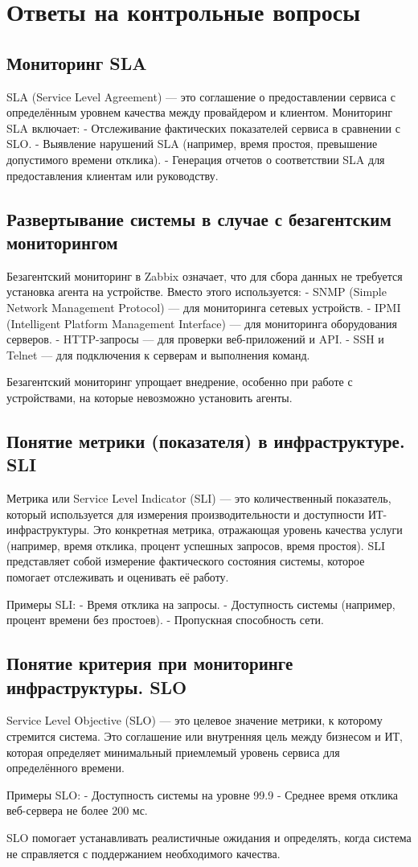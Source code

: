 \clearpage

\section{Ответы на контрольные вопросы}
\subsection{Мониторинг SLA}
SLA (Service Level Agreement) — это соглашение о предоставлении сервиса с определённым уровнем качества между провайдером и клиентом. Мониторинг SLA включает:
- Отслеживание фактических показателей сервиса в сравнении с SLO.
- Выявление нарушений SLA (например, время простоя, превышение допустимого времени отклика).
- Генерация отчетов о соответствии SLA для предоставления клиентам или руководству.

\subsection{Развертывание системы в случае с безагентским мониторингом}
Безагентский мониторинг в Zabbix означает, что для сбора данных не требуется установка агента на устройстве. Вместо этого используется:
- SNMP (Simple Network Management Protocol) — для мониторинга сетевых устройств.
- IPMI (Intelligent Platform Management Interface) — для мониторинга оборудования серверов.
- HTTP-запросы — для проверки веб-приложений и API.
- SSH и Telnet — для подключения к серверам и выполнения команд.

Безагентский мониторинг упрощает внедрение, особенно при работе с устройствами, на которые невозможно установить агенты.

\subsection{Понятие метрики (показателя) в инфраструктуре. SLI}
Метрика или Service Level Indicator (SLI) — это количественный показатель, который используется для измерения производительности и доступности ИТ-инфраструктуры. Это конкретная метрика, отражающая уровень качества услуги (например, время отклика, процент успешных запросов, время простоя). SLI представляет собой измерение фактического состояния системы, которое помогает отслеживать и оценивать её работу.

Примеры SLI:
- Время отклика на запросы.
- Доступность системы (например, процент времени без простоев).
- Пропускная способность сети.

\subsection{Понятие критерия при мониторинге инфраструктуры. SLO}
Service Level Objective (SLO) — это целевое значение метрики, к которому стремится система. Это соглашение или внутренняя цель между бизнесом и ИТ, которая определяет минимальный приемлемый уровень сервиса для определённого времени.

Примеры SLO:
- Доступность системы на уровне 99.9%
- Среднее время отклика веб-сервера не более 200 мс.

SLO помогает устанавливать реалистичные ожидания и определять, когда система не справляется с поддержанием необходимого качества.

